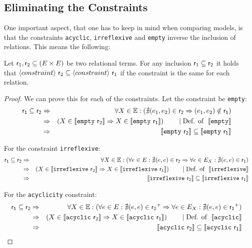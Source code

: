 \documentclass[a4paper,twoside,12pt, english]{article}
\begin{document}
\subsection{Eliminating the Constraints}\label{sec:constraints}
One important aspect, that one has to keep in mind when comparing models, is that the constraints \texttt{acyclic}, \texttt{irreflexive} and \texttt{empty} inverse the inclusion of relations.
This means the following:
\begin{lemma}\label{lem:elimination}
Let $\textsf{\upshape r}_1, \textsf{\upshape r}_2 \subseteq (E \times E)$ be two relational terms. For any inclusion $\textsf{\upshape r}_1 \subseteq \textsf{\upshape r}_2$ it holds that $\langle constraint \rangle~ \textsf{\upshape r}_2 \subseteq \langle constraint \rangle~ \textsf{\upshape r}_1$ if the constraint is the same for each relation.
\end{lemma}
\begin{proof}
We can prove this for each of the constraints. 
Let the constraint be \texttt{empty}:
\begin{eqnarray*}
\sf r_1 \subseteq r_2 
& \Rightarrow &\forall X \in \mathbb{E} : (\nexists (e_1,e_2) \in {\sf r_2} \Rightarrow (e_1,e_2) \notin {\sf r_1}) \\
& \Rightarrow &(X \in \llbracket \texttt{empty}~ \textsf{\upshape r}_2 \rrbracket \Rightarrow X \in \llbracket \texttt{empty}~ \sf r_1 \rrbracket) \qquad \mid \text{Def. of }~ \llbracket \texttt{empty} \rrbracket\\
& \Rightarrow & \llbracket \texttt{empty}~ \sf r_2 \rrbracket \subseteq \llbracket \texttt{empty}~ \sf r_1 \rrbracket
\end{eqnarray*}

\noindent For the constraint \texttt{irreflexive}:
\begin{eqnarray*}
\sf r_1 \subseteq r_2 
& \Rightarrow &\forall X \in \mathbb{E} : (\forall e \in E: \nexists(e,e) \in {\sf r_2} \Rightarrow \forall e \in E_X: \nexists (e,e) \in {\sf r_1}) \\
& \Rightarrow &(X \in \llbracket \texttt{irreflexive}~ \textsf{\upshape r}_2 \rrbracket \Rightarrow X \in \llbracket \texttt{irreflexive}~ \sf r_1 \rrbracket) \qquad \mid \text{Def. of }~ \llbracket \texttt{irreflexive} \rrbracket \\
& \Rightarrow & \llbracket \texttt{irreflexive}~ \sf r_2 \rrbracket \subseteq \llbracket \texttt{irreflexive}~ \sf r_1 \rrbracket
\end{eqnarray*}

\noindent For the \texttt{acyclicity} constraint:
\begin{eqnarray*}
\sf r_1 \subseteq r_2 
& \Rightarrow &\forall X \in \mathbb{E} : (\forall e \in E: \nexists(e,e) \in {\sf r_2}^+ \Rightarrow \forall e \in E_X: \nexists (e,e) \in {\sf r_1}^+) \\
& \Rightarrow &(X \in \llbracket \texttt{acyclic}~ \textsf{\upshape r}_2 \rrbracket \Rightarrow X \in \llbracket \texttt{acyclic}~ \sf r_1 \rrbracket) \qquad \mid \text{Def. of }~ \llbracket \texttt{acyclic} \rrbracket \\
& \Rightarrow & \llbracket \texttt{acyclic}~ \sf r_2 \rrbracket \subseteq \llbracket \texttt{acyclic}~ \sf r_1 \rrbracket
\end{eqnarray*}
\end{proof}
\end{document}
